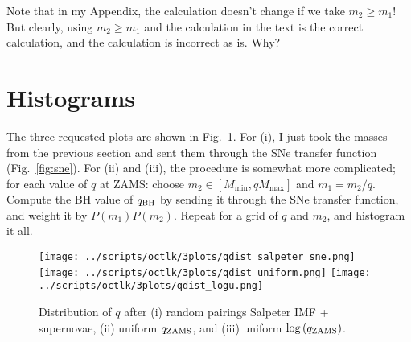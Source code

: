 \documentclass[11pt,
        usenames, %
        dvipsnames %
    ]{article}
\newcommand*{\p}[1]{\left(#1\right)}
\begin{document}
Note that in my Appendix, the calculation doesn't change if we take $m_2 \geq
m_1$! But clearly, using $m_2 \geq m_1$ and the calculation in the text is the
correct calculation, and the calculation is incorrect as is. Why?

\section{Histograms}

The three requested plots are shown in Fig.~\ref{fig:2}. For (i), I just took
the masses from the previous section and sent them through the SNe transfer
function (Fig.~\ref{fig:sne}). For (ii) and (iii), the procedure is somewhat
more complicated; for each value of $q$ at ZAMS\@: choose $m_2 \in [M_{\min},
qM_{\max}]$ and $m_1 = m_2 / q$. Compute the BH value of $q_{\rm BH}$ by sending
it through the SNe transfer function, and weight it by $P(m_1)P(m_2)$. Repeat
for a grid of $q$ and $m_2$, and histogram it all.
\begin{figure}
    \centering
    \texttt{[image: ../scripts/octlk/3plots/qdist\_salpeter\_sne.png]}
    \texttt{[image: ../scripts/octlk/3plots/qdist\_uniform.png]}
    \texttt{[image: ../scripts/octlk/3plots/qdist\_logu.png]}
    \caption{Distribution of $q$ after (i) random pairings Salpeter IMF +
    supernovae, (ii) uniform $q_{\rm ZAMS}$, and (iii) uniform $\log\p{q_{\rm
    ZAMS}}$.}\label{fig:2}
\end{figure}
\end{document}
